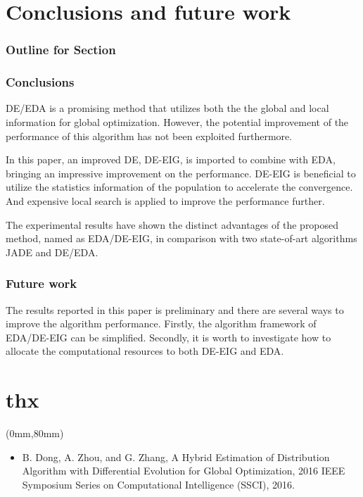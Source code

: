 \documentclass[xcolor=dvipsnames]{beamer}
\newenvironment{reference}[2]{%
  \begin{textblock*}{\textwidth}(#1,#2)
     \bgroup\fontsize{6pt}{\baselineskip}\selectfont\color[RGB]{0,112,192}}{\egroup\end{textblock*}}
\begin{document}
    \section{Conclusions and future work}
    \begin{frame}
      \frametitle{Outline for Section \thesection}
      \tableofcontents[currentsection]
    \end{frame}
    
    \begin{frame}
    \frametitle{Conclusions}
    DE/EDA is a promising method that utilizes both the the global and local information for global optimization. However, the potential improvement of the performance of this algorithm has not been exploited furthermore.
    \par
     In this paper, an improved DE, DE-EIG, is imported to combine with EDA, bringing an impressive improvement on the performance. DE-EIG is beneficial to utilize the statistics information of the population to accelerate the convergence. And expensive local search is applied to improve the performance further.

     The experimental results have shown the distinct advantages of the proposed method, named as EDA/DE-EIG, in comparison with two state-of-art algorithms JADE and DE/EDA.
    \end{frame}

    \begin{frame}
    \frametitle{Future work}
    The results reported in this paper is preliminary and there are several ways to improve the algorithm performance. Firstly, the algorithm framework of EDA/DE-EIG can be simplified. Secondly, it is worth to investigate how to allocate the computational resources to both DE-EIG and EDA.
    \end{frame}


    \section*{thx}
        \begin{frame}
        \begin{center}
        \fontsize{60pt}{\baselineskip}\selectfont {}
        \end{center}
        \begin{reference}{0mm}{80mm}
        \begin{itemize}
        \item  B. Dong, A. Zhou, and G. Zhang, A Hybrid Estimation of Distribution Algorithm with Differential Evolution for Global Optimization, 2016 IEEE Symposium Series on Computational Intelligence (SSCI), 2016.
        \end{itemize}
        \end{reference}
        \end{frame}
\end{document}
